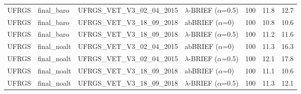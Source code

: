 \begin{table}[t]
\begin{tabular}{llllrrr}
UFRGS & final_baro & UFRGS\_VET\_V3\_02\_04\_2015 & $\lambda$-BRIEF ($\alpha$=0.5) & 100 & 11.8 & 12.7 \\
UFRGS & final_baro & UFRGS\_VET\_V3\_18\_09\_2018 & abBRIEF ($\alpha$=0) & 100 & 10.8 & 10.6 \\
UFRGS & final_baro & UFRGS\_VET\_V3\_18\_09\_2018 & $\lambda$-BRIEF ($\alpha$=0.5) & 100 & 11.2 & 11.6 \\
UFRGS & final_noalt & UFRGS\_VET\_V3\_02\_04\_2015 & abBRIEF ($\alpha$=0) & 100 & 11.3 & 16.3 \\
UFRGS & final_noalt & UFRGS\_VET\_V3\_02\_04\_2015 & $\lambda$-BRIEF ($\alpha$=0.5) & 100 & 12.1 & 17.8 \\
UFRGS & final_noalt & UFRGS\_VET\_V3\_18\_09\_2018 & abBRIEF ($\alpha$=0) & 100 & 11.1 & 10.6 \\
UFRGS & final_noalt & UFRGS\_VET\_V3\_18\_09\_2018 & $\lambda$-BRIEF ($\alpha$=0.5) & 100 & 11.3 & 12.1 \\
\bottomrule
\end{tabular}
\end{table}
